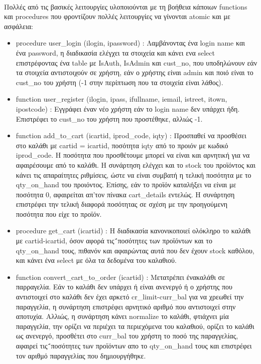 \documentclass[12pt]{article}
\begin{document}
  	  \paragraph{}
  	  	Πολλές από τις βασικές λειτουργίες υλοποιούνται με τη βοήθεια κάποιων functions και procedures που φροντίζουν πολλές λειτουργίες να γίνονται atomic και με ασφάλεια:
  	  	\begin{itemize}
  	  		\item procedure user\_login (ilogin, ipassword) : Λαμβάνοντας ένα login name και ένα password, η διαδικασία ελέγχει τα στοιχεία και κάνει ενα select επιστρέφοντας ένα table με IsAuth, IsAdmin και cust\_no, που υποδηλώνουν εάν τα στοιχεία αντιστοιχούν σε χρήστη, εάν ο χρήστης είναι admin και ποιό είναι το cust\_no του χρήστη (-1 στην περίπτωση που τα στοιχεία είναι λάθος).
  	  		\item function user\_register (ilogin, ipass, ifullname, iemail, istreet, itown, ipostcode) : Εγγράφει έναν νέο χρήστη εάν το login name δεν υπάρχει ήδη. Επιστρέφει το cust\_no του χρήστη που προστέθηκε, αλλιώς -1.
  	  		\item function add\_to\_cart (icartid, iprod\_code, iqty) : Προσπαθεί να προσθέσει στο καλάθι με cartid = icartid, ποσότητα iqty από το προιόν με κωδικό iprod\_code. Η ποσότητα που προσθέτουμε μπορεί να είναι και αρνητική για να αφαιρέσουμε από το καλάθι. Η συνάρτηση ελέγχει και το stock του προϊόντος και κάνει τις απαραίτητες ριθμίσεις, ώστε να είναι συμβατή η τελική ποσότητα με το qty\_on\_hand του προιόντος. Επίσης, εάν το προϊόν καταλήξει να είναι με ποσότητα 0, αφαιρείται απ'τον πίνακα cart\_details εντελώς. Η συνάρτηση επιστρέφει την τελική διαφορά ποσότητας σε σχέση με την προηγούμενη ποσότητα που είχε το προϊόν.
  	  		\item procedure get\_cart (icartid) : Η διαδικασία κανονικοποιεί ολόκληρο το καλάθι με cartid-icartid, όσον αφορά τις΅ποσότητες των προϊόντων και το qty\_on\_hand τους, πιθανόν και αφαιρώντας αυτά που δεν έχουν stock καθόλου, και κάνει ένα select με όλα τα δεδομένα του καλαθιού.
  	  		\item function convert\_cart\_to\_order (icartid) : Μετατρέπει ένακαλάθι σε παρραγελία. Εάν το καλάθι δεν υπάρχει ή είναι ανενεργό ή ο χρήστης που αντιστοιχεί στο καλάθι δεν έχει αρκετό cr\_limit-curr\_bal για να χρεωθεί την παραγγελία, η συνάρτηση επιστρέφει αρνητικό αριθμό που αντιστοιχεί στην αποτυχία. Αλλιώς, η συνάρτηση κάνει normalize το καλάθι, φτιάχνει μία παραγγελία, την ορίζει να περιέχει τα περιεχόμενα του καλαθιού, ορίζει το καλάθι ως ανενεργό, προσθέτει στο curr\_bal του χρήστη το ποσό της παραγγελίας, αφαιρεί τις΅ποσότητες των προϊόντων απο το qty\_on\_hand τους και επιστρέφει τον αριθμό παραγγελίας που δημιουργήθηκε.

\end{itemize}
\end{document}
